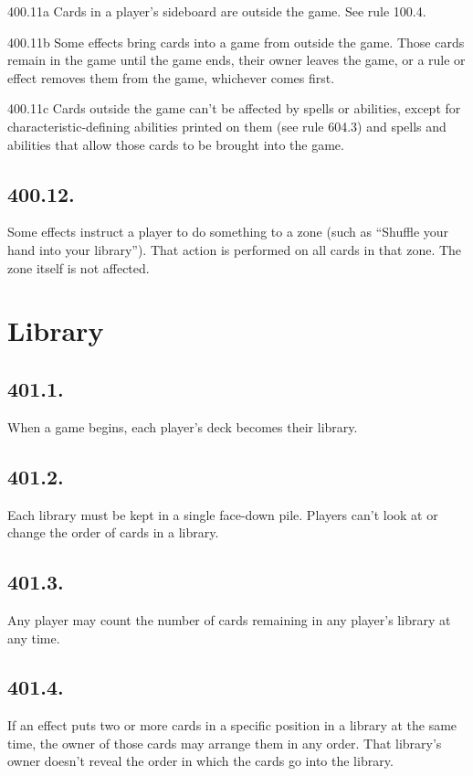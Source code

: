 400.11a Cards in a player’s sideboard are outside the game. See rule 100.4.

400.11b Some effects bring cards into a game from outside the game. Those cards remain in the game until the game ends, their owner leaves the game, or a rule or effect removes them from the game, whichever comes first.

400.11c Cards outside the game can’t be affected by spells or abilities, except for characteristic-defining abilities printed on them (see rule 604.3) and spells and abilities that allow those cards to be brought into the game.

\subsection*{400.12.}
Some effects instruct a player to do something to a zone (such as “Shuffle your hand into your library”). That action is performed on all cards in that zone. The zone itself is not affected.

\section{Library}
\subsection*{401.1.}
When a game begins, each player’s deck becomes their library.

\subsection*{401.2.}
Each library must be kept in a single face-down pile. Players can’t look at or change the order of cards in a library.

\subsection*{401.3.}
Any player may count the number of cards remaining in any player’s library at any time.

\subsection*{401.4.}
If an effect puts two or more cards in a specific position in a library at the same time, the owner of those cards may arrange them in any order. That library’s owner doesn’t reveal the order in which the cards go into the library.

